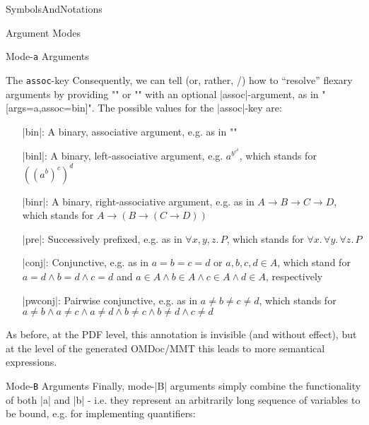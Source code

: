 \begin{smodule}[ns=https://github.com/slatex/sTeX/doc]{SymbolsAndNotations}
\begin{sfragment}{Argument Modes}
\begin{sfragment}{Mode-\texttt a Arguments}
\begin{sfragment}{The \texttt{assoc}-key}
            Consequently, we can tell \sTeX (or, rather, \mmt/\omdoc) how to ``resolve''
            flexary arguments by providing \stexcode"\symdecl" or \stexcode"\symdef" with
            an optional |assoc|-argument, as in
            \stexcode"[args=a,assoc=bin]".  The possible values for the
            |assoc|-key are:
            \begin{itemize}
                \item[|bin|:] A binary, associative argument, e.g.
                    as in \stexcode"\addition"
                \item[|binl|:] A binary, left-associative argument, e.g.
                    $a^{\scriptstyle b^{\scriptstyle c^d}}$, which stands for $((a^b)^c)^d$
                \item[|binr|:] A binary, right-associative argument,
                    e.g. as in $A\to B\to C\to D$, which stands
                    for $A \to (B \to (C \to D))$
                \item[|pre|:] Successively prefixed, e.g. as in
                    $\forall x,y,z.\,P$, which stands for
                    $\forall x.\, \forall y.\, \forall z.\,P$
                \item[|conj|:] Conjunctive, e.g. as in
                    $a=b=c=d$ or $a,b,c,d\in A$, which stand for
                    $a=d\wedge b=d\wedge c=d$ and $a\in A\wedge b\in A
                    \wedge c\in A\wedge d\in A$, respectively
                \item[|pwconj|:] Pairwise conjunctive, e.g. as in
                    $a\neq b\neq c\neq d$, which stands for
                    $a\neq b\wedge a\neq c\wedge a\neq d\wedge b\neq c\wedge b\neq d\wedge c\neq d$
                  \end{itemize}
                  As before, at the PDF level, this annotation is invisible (and without
                  effect), but at the level of the generated OMDoc/MMT this leads to more
                  semantical expressions. 
        \end{sfragment}

    \end{sfragment}
    
    \begin{sfragment}{Mode-\texttt B Arguments}
        Finally, mode-|B| arguments simply combine the functionality
        of both |a| and |b| - i.e. they represent an arbitrarily
        long sequence of variables to be bound, e.g. for implementing
        quantifiers:


\end{sfragment}
\end{sfragment}
\end{smodule}

